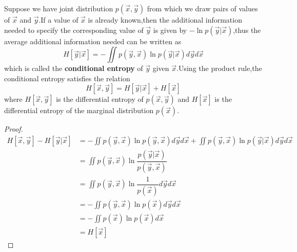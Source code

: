 Suppose we have joint distribution $p(\vec{x},\vec{y})$ from which we draw pairs of values of $\vec{x}$ and $\vec{y}$.If a value of $\vec{x}$ is already known,then the additional information needed to specify the corresponding value of $\vec{y}$ is given by $-\ln p(\vec{y}|\vec{x})$,thus the average additional information needed can be written as
\begin{equation}
H[\vec{y}|\vec{x}] = -\iint p(\vec{y},\vec{x})\ln p(\vec{y}|\vec{x})d\vec{y}d\vec{x}
\end{equation}
which is called the \textbf{conditional entropy} of $\vec{y}$ given $\vec{x}$.Using the product rule,the conditional entropy satisfies the relation
\begin{equation}
H[\vec{x},\vec{y}] = H[\vec{y}|\vec{x}] + H[\vec{x}]
\end{equation}
where $H[\vec{x},\vec{y}]$ is the differential entropy of $p(\vec{x},\vec{y})$ and $H[\vec{x}]$ is the differential entropy of the marginal distribution $p(\vec{x})$.
\begin{proof}
	\begin{align}
	H[\vec{x},\vec{y}] - H[\vec{y}|\vec{x}] &=  -\iint p(\vec{y},\vec{x}) \ln p(\vec{y},\vec{x})d\vec{y}d\vec{x} + \iint p(\vec{y},\vec{x})\ln p(\vec{y}|\vec{x})d\vec{y}d\vec{x} \\
	& = \iint p(\vec{y},\vec{x}) \ln \dfrac{p(\vec{y}|\vec{x})}{p(\vec{y},\vec{x})} \\
	& = \iint p(\vec{y},\vec{x}) \ln \dfrac{1}{p(\vec{x})}d\vec{y}d\vec{x} \\
	& = -\iint p(\vec{y},\vec{x}) \ln {p(\vec{x})}d\vec{y}d\vec{x} \\
	& = -\iint p(\vec{x}) \ln {p(\vec{x})}d\vec{x} \\
	& = H[\vec{x}]
	\end{align}
\end{proof}

